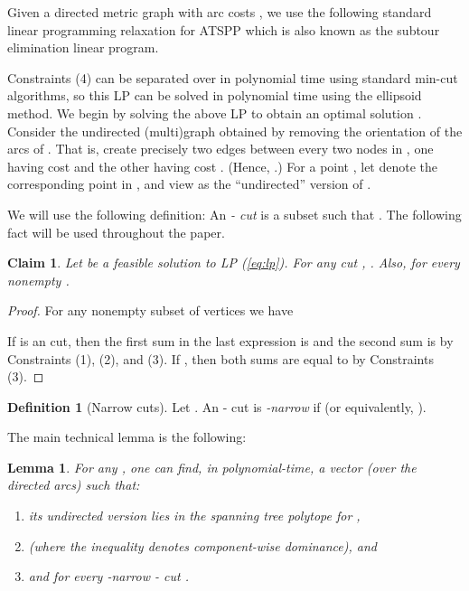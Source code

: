\documentclass[11pt]{article}
\newtheorem{claim}[theorem]{Claim}
\newtheorem{lemma}[theorem]{Lemma}
\theoremstyle{definition}
\newtheorem{definition}[theorem]{Definition}
\newcounter{note}[section]
\begin{document}
Given a directed metric graph  with arc costs , we use the following standard linear programming relaxation for
ATSPP which is also known as the subtour elimination linear program.
  


Constraints (4) can be separated over in polynomial time using
standard min-cut algorithms, so this LP can be solved
in polynomial time using the ellipsoid method.
We begin by solving the above LP to obtain an optimal solution .
Consider the undirected (multi)graph  obtained by removing
the orientation of the arcs of . That is, create precisely two edges
between every two nodes  in , one having cost  and
the other having cost . (Hence, .) For a point , let  denote the corresponding point in ,
and view  as the ``undirected'' version of .



We will use the following definition: An \emph{- cut} is a subset
 such that . The following fact will be used throughout the paper.

\begin{claim} \label{claim:lp}
Let  be a feasible solution to LP (\ref{eq:lp}). For any  cut , .
Also,  for every nonempty .
\end{claim}
\begin{proof}
For any nonempty subset of vertices  we have

If  is an  cut, then the first sum in the last expression is  and the second sum is  by Constraints (1), (2), and (3). If ,
then both sums are equal to  by Constraints (3).
\end{proof}


\begin{definition}[Narrow cuts]
  Let . An - cut  is \emph{-narrow} if
   (or equivalently, ).
\end{definition}

The main technical lemma is the following:
\begin{lemma}\label{lem:fix_sol}
  For any , one can find, in polynomial-time, a vector
   (over the directed arcs) such that:
  \begin{enumerate}
  \item[(a)] its undirected version  lies in the spanning tree
    polytope for ,
  \item[(b)]  (where the inequality
    denotes component-wise dominance), and
  \item[(c)]  and  for every
    -narrow - cut .
\end{enumerate}
\end{lemma}
\end{document}
